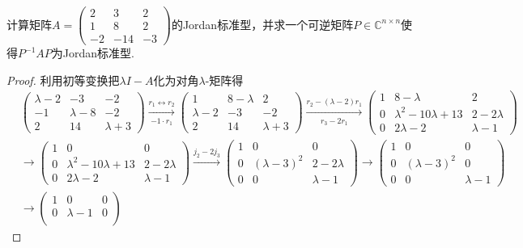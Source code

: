 \documentclass[../../main.tex]{subfiles}
\begin{document}
\begin{example}
计算矩阵$A=\begin{pmatrix}2 & 3 & 2 \\ 1 & 8 & 2 \\ -2 & -14 & -3\end{pmatrix}$的Jordan标准型，并求一个可逆矩阵$P\in\mathbb{C}^{n\times n}$使得$P^{-1}AP$为Jordan标准型. 
\end{example}
\begin{proof}
利用初等变换把$\lambda I - A$化为对角$\lambda$-矩阵得
\begin{align*}
&\begin{pmatrix}
\lambda - 2 & -3 & -2 \\
-1 & \lambda - 8 & -2 \\
2 & 14 & \lambda + 3
\end{pmatrix}
\xrightarrow[-1 \cdot r_1]{r_1 \longleftrightarrow r_2}
\begin{pmatrix}
1 & 8 - \lambda & 2 \\
\lambda - 2 & -3 & -2 \\
2 & 14 & \lambda + 3
\end{pmatrix}
\xrightarrow[r_3 - 2r_1]{r_2 - (\lambda - 2)r_1}
\begin{pmatrix}
1 & 8 - \lambda & 2 \\
0 & \lambda^2 - 10\lambda + 13 & 2 - 2\lambda \\
0 & 2\lambda - 2 & \lambda - 1
\end{pmatrix} \\
&\longrightarrow
\begin{pmatrix}
1 & 0 & 0 \\
0 & \lambda^2 - 10\lambda + 13 & 2 - 2\lambda \\
0 & 2\lambda - 2 & \lambda - 1
\end{pmatrix}
\xrightarrow[]{j_2 - 2j_3}
\begin{pmatrix}
1 & 0 & 0 \\
0 & (\lambda - 3)^2 & 2 - 2\lambda \\
0 & 0 & \lambda - 1
\end{pmatrix}
\longrightarrow
\begin{pmatrix}
1 & 0 & 0 \\
0 & (\lambda - 3)^2 & 0 \\
0 & 0 & \lambda - 1
\end{pmatrix} \\
&\longrightarrow
\begin{pmatrix}
1 & 0 & 0 \\
0 & \lambda - 1 & 0 \\

\end{pmatrix}
\end{align*}
\end{proof}
\end{document}

